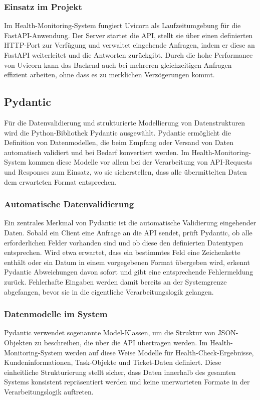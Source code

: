 \subsubsection{Einsatz im Projekt}
Im Health-Monitoring-System fungiert Uvicorn als Laufzeitumgebung für die FastAPI-Anwendung. Der Server startet die API, stellt sie über einen definierten HTTP-Port zur Verfügung und verwaltet eingehende Anfragen, indem er diese an FastAPI weiterleitet und die Antworten zurückgibt. Durch die hohe Performance von Uvicorn kann das Backend auch bei mehreren gleichzeitigen Anfragen effizient arbeiten, ohne dass es zu merklichen Verzögerungen kommt.

\subsection{Pydantic}
Für die Datenvalidierung und strukturierte Modellierung von Datenstrukturen wird die Python-Bibliothek Pydantic ausgewählt. Pydantic ermöglicht die Definition von Datenmodellen, die beim Empfang oder Versand von Daten automatisch validiert und bei Bedarf konvertiert werden. Im Health-Monitoring-System kommen diese Modelle vor allem bei der Verarbeitung von API-Requests und Responses zum Einsatz, wo sie sicherstellen, dass alle übermittelten Daten dem erwarteten Format entsprechen. \cite{pydantic_docs}

\subsubsection{Automatische Datenvalidierung}
Ein zentrales Merkmal von Pydantic ist die automatische Validierung eingehender Daten. Sobald ein Client eine Anfrage an die API sendet, prüft Pydantic, ob alle erforderlichen Felder vorhanden sind und ob diese den definierten Datentypen entsprechen. Wird etwa erwartet, dass ein bestimmtes Feld eine Zeichenkette enthält oder ein Datum in einem vorgegebenen Format übergeben wird, erkennt Pydantic Abweichungen davon sofort und gibt eine entsprechende Fehlermeldung zurück. Fehlerhafte Eingaben werden damit bereits an der Systemgrenze abgefangen, bevor sie in die eigentliche Verarbeitungslogik gelangen. \cite{pydantic_validation}

\subsubsection{Datenmodelle im System}
Pydantic verwendet sogenannte Model-Klassen, um die Struktur von JSON-Objekten zu beschreiben, die über die API übertragen werden. Im Health-Monitoring-System werden auf diese Weise Modelle für Health-Check-Ergebnisse, Kundeninformationen, Task-Objekte und Ticket-Daten definiert. Diese einheitliche Strukturierung stellt sicher, dass Daten innerhalb des gesamten Systems konsistent repräsentiert werden und keine unerwarteten Formate in der Verarbeitungslogik auftreten.

